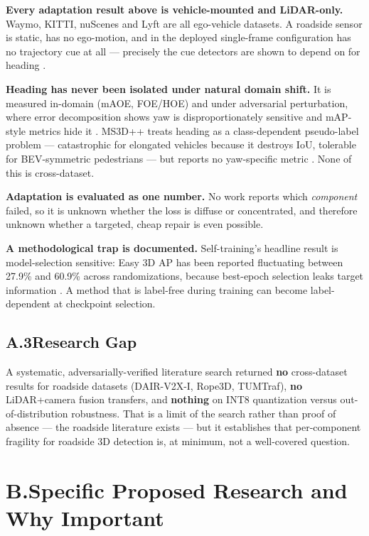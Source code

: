 \documentclass[10pt,letterpaper]{article}
\begin{document}
\textbf{Every adaptation result above is vehicle-mounted and LiDAR-only.} Waymo, KITTI,
nuScenes and Lyft are all ego-vehicle datasets. A roadside sensor is static, has no ego-motion,
and in the deployed single-frame configuration has no trajectory cue at all --- precisely the
cue detectors are shown to depend on for heading \cite{cui}.

\textbf{Heading has never been isolated under natural domain shift.} It is measured in-domain
(mAOE, FOE/HOE) and under adversarial perturbation, where error decomposition shows yaw is
disproportionately sensitive and mAP-style metrics hide it \cite{robust}. MS3D++ treats heading
as a class-dependent pseudo-label problem --- catastrophic for elongated vehicles because it
destroys IoU, tolerable for BEV-symmetric pedestrians --- but reports no yaw-specific metric
\cite{ms3d}. None of this is cross-dataset.

\textbf{Adaptation is evaluated as one number.} No work reports which \emph{component} failed,
so it is unknown whether the loss is diffuse or concentrated, and therefore unknown whether a
targeted, cheap repair is even possible.

\textbf{A methodological trap is documented.} Self-training's headline result is
model-selection sensitive: Easy 3D AP has been reported fluctuating between 27.9\% and 60.9\%
across randomizations, because best-epoch selection leaks target information
\cite{st3drepro}. A method that is label-free during training can become label-dependent at
checkpoint selection.

\subsection{A.3\quad Research Gap}

A systematic, adversarially-verified literature search returned \textbf{no} cross-dataset
results for roadside datasets (DAIR-V2X-I, Rope3D, TUMTraf), \textbf{no} LiDAR+camera fusion
transfers, and \textbf{nothing} on INT8 quantization versus out-of-distribution robustness.
That is a limit of the search rather than proof of absence --- the roadside literature exists
--- but it establishes that per-component fragility for roadside 3D detection is, at minimum,
not a well-covered question.

\section{B.\quad Specific Proposed Research and Why Important}
\end{document}
